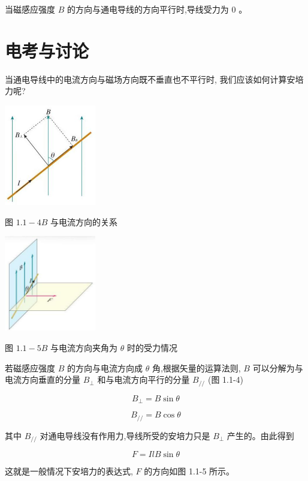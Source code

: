 \documentclass[10pt]{article}
\begin{document}
当磁感应强度 \(B\) 的方向与通电导线的方向平行时,导线受力为 0 。

\section*{电考与讨论}

当通电导线中的电流方向与磁场方向既不垂直也不平行时, 我们应该如何计算安培力呢?

\begin{center}
\includegraphics[max width=0.3\textwidth]{images/01910e72-c5b7-7ed5-a6d4-fb3a5faefc32_9_214798.jpg}
\end{center}

图 \({1.1} - {4B}\) 与电流方向的关系

\begin{center}
\includegraphics[max width=0.3\textwidth]{images/01910e72-c5b7-7ed5-a6d4-fb3a5faefc32_9_610985.jpg}
\end{center}

图 \({1.1} - {5B}\) 与电流方向夹角为 \(\theta\) 时的受力情况

若磁感应强度 \(B\) 的方向与电流方向成 \(\theta\) 角,根据矢量的运算法则, \(B\) 可以分解为与电流方向垂直的分量 \({B}_{ \bot }\) 和与电流方向平行的分量 \({B}_{//}\) (图 1.1-4)

\[
{B}_{ \bot } = B\sin \theta
\]

\[
{B}_{//} = B\cos \theta
\]

其中 \({B}_{//}\) 对通电导线没有作用力,导线所受的安培力只是 \({B}_{ \bot }\) 产生的。由此得到

\[
F = {IlB}\sin \theta
\]

这就是一般情况下安培力的表达式, \(F\) 的方向如图 1.1-5 所示。
\end{document}
